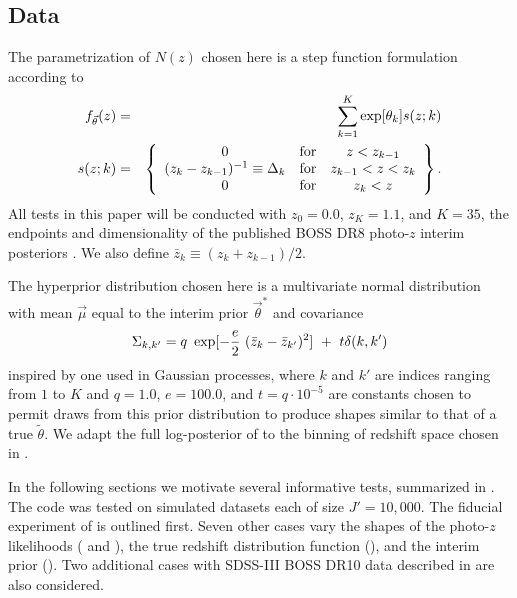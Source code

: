\subsection{Data}

The parametrization of $N(z)$ chosen here is a step function formulation according to
\begin{eqnarray}
\eqlabel{eq:steps}
f_{\vec{\theta}}(z)&=&\sum_{k=1}^{K}\exp[\theta_{k}]s(z;k)\\
s(z;k)&=&\left\{\begin{array}{ccc}0&\text{for}&z<z_{k-1}\\(z_{k}-z_{k-1})^{-1} \equiv\Delta_{k}&\text{for}&z_{k-1}<z<z_{k}\\0&\text{for}&z_{k}<z\end{array}\right
\}.
\end{eqnarray}
All tests in this paper will be conducted with $z_{0}=0.0$, $z_{K}=1.1$, and $K=35$, the endpoints and dimensionality of the published BOSS DR8 photo-$z$ interim posteriors \citet{Sheldon2012}.  
We also define $\bar{z}_{k}\equiv(z_{k}+z_{k-1})/2$.

The hyperprior distribution chosen here is a multivariate normal distribution with mean $\vec{\mu}$ equal to the interim prior $\vec{\theta}^{*}$ and covariance
\begin{equation}
\eqlabel{eq:priorcov}
\Sigma_{k,k'} = q\ \exp[-\frac{e}{2}\ (\bar{z}_{k}-\bar{z}_{k'})^{2}]\ +\ t\delta(k,k')
\end{equation}
inspired by one used in Gaussian processes, where $k$ and $k'$ are indices ranging from $1$ to $K$ and $q=1.0$, $e=100.0$, and $t=q\cdot10^{-5}$ are constants chosen to permit draws from this prior distribution to produce shapes similar to that of a true $\tilde{\theta}$.  
We adapt the full log-posterior of  to the binning of redshift space chosen in .

In the following sections we motivate several informative tests, summarized in .  
The code was tested on simulated datasets each of size $J'=10,000$.  
The fiducial experiment of  is outlined first. 
Seven other cases vary the shapes of the photo-$z$ likelihoods ( and ), the true redshift distribution function (), and the interim prior ().  
Two additional cases with SDSS-III BOSS DR10 data described in  are also considered.

